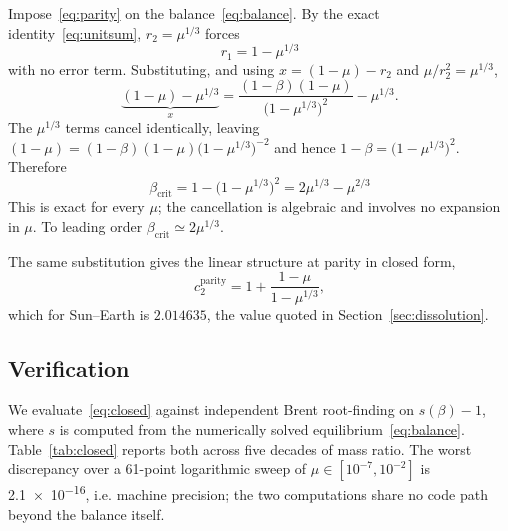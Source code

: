 \documentclass[11pt,a4paper]{article}
\begin{document}
Impose~\eqref{eq:parity} on the balance~\eqref{eq:balance}. By the exact
identity~\eqref{eq:unitsum}, $r_2=\mu^{1/3}$ forces
\begin{equation}
  r_1 = 1-\mu^{1/3}
\end{equation}
with no error term. Substituting, and using $x=(1-\mu)-r_2$ and
$\mu/r_2^{2}=\mu^{1/3}$,
\begin{equation}
  \underbrace{(1-\mu)-\mu^{1/3}}_{x}
  = \frac{(1-\beta)(1-\mu)}{\bigl(1-\mu^{1/3}\bigr)^{2}} - \mu^{1/3} .
\end{equation}
The $\mu^{1/3}$ terms cancel identically, leaving
$(1-\mu)=(1-\beta)(1-\mu)\bigl(1-\mu^{1/3}\bigr)^{-2}$ and hence
$1-\beta=\bigl(1-\mu^{1/3}\bigr)^{2}$. Therefore
\begin{equation}
  \boxed{\;
  \beta_{\mathrm{crit}} = 1-\bigl(1-\mu^{1/3}\bigr)^{2}
                        = 2\mu^{1/3}-\mu^{2/3}
  \;}
  \label{eq:closed}
\end{equation}
This is exact for every $\mu$; the cancellation is algebraic and involves no
expansion in $\mu$. To leading order $\beta_{\mathrm{crit}}\simeq2\mu^{1/3}$.

The same substitution gives the linear structure at parity in closed form,
\begin{equation}
  c_2^{\mathrm{parity}} = 1 + \frac{1-\mu}{1-\mu^{1/3}} ,
  \label{eq:Aparity}
\end{equation}
which for Sun--Earth is $2.014635$, the value quoted in
Section~\ref{sec:dissolution}.

\subsection{Verification}

We evaluate~\eqref{eq:closed} against independent Brent root-finding on
$s(\beta)-1$, where $s$ is computed from the numerically solved
equilibrium~\eqref{eq:balance}. Table~\ref{tab:closed} reports both across five
decades of mass ratio. The worst discrepancy over a 61-point logarithmic sweep
of $\mu\in[10^{-7},10^{-2}]$ is \num{2.1e-16}, i.e. machine precision; the two
computations share no code path beyond the balance itself.
\end{document}
